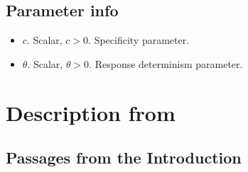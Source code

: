 \documentclass[12pt]{article}
\begin{document}
\subsection{Parameter info}
\begin{itemize}
    \setlength\itemsep{-0.5em}
    \item $c$. Scalar, $c>0$. Specificity parameter.
    \item $\theta$. Scalar, $\theta > 0$. Response determinism parameter.
\end{itemize}



\clearpage




\clearpage
\appendix
\section{Description from \cite{jern2013probabilistic}}
\label{ap:jk13ap}

\subsection{Passages from the Introduction}
\end{document}
